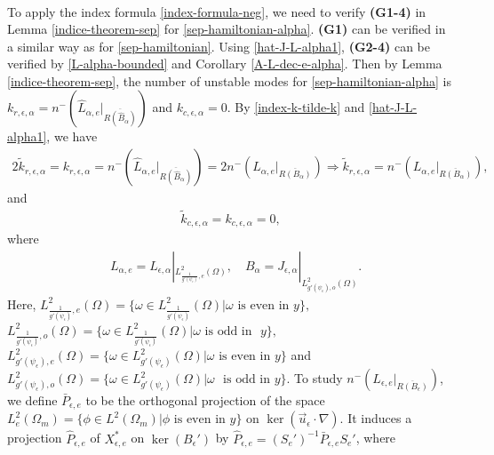 \documentclass[1 [leqno, 11pt]{amsart}
\numberwithin{equation}{section}
\let\ep=\epsilon
\begin{document}
\begin{CJK*}{GBK}{song}
\begin{align}
\end{align}
To apply the index formula  \eqref{index-formula-neg},
 we need to verify
{\textbf{(G1-4)}}  in Lemma \ref{indice-theorem-sep} for \eqref{sep-hamiltonian-alpha}. {\textbf{(G1)}} can be verified in a similar way as for \eqref{sep-hamiltonian}. Using \eqref{hat-J-L-alpha1},
{\textbf{(G2-4)}} can be verified by \eqref{L-alpha-bounded} and Corollary \ref{A-L-dec-e-alpha}. Then by Lemma \ref{indice-theorem-sep}, the number of unstable modes  for \eqref{sep-hamiltonian-alpha} is
$k_{r,\ep,\alpha}=n^-\left(\hat{L}_{\alpha,e}|_{\overline{R(\hat{B}_\alpha)}} \right)$ and $k_{c,\ep,\alpha}=0$. By \eqref{index-k-tilde-k} and  \eqref{hat-J-L-alpha1},
we have
\begin{align*}
2\tilde k_{r,\ep,\alpha}=k_{r,\ep,\alpha}=n^-\left(\hat{L}_{\alpha,e}|_{\overline{R(\hat{B}_\alpha)}} \right)=2n^-\left(L_{\alpha,e}|_{\overline{R(B_\alpha)}} \right)\Longrightarrow\tilde k_{r,\ep,\alpha}=n^-\left(L_{\alpha,e}|_{\overline{R(B_\alpha)}} \right),
\end{align*}
and
\begin{align}\label{index-formula-for-modulational-instabilitykc}\tilde k_{c,\ep,\alpha}=k_{c,\ep,\alpha}=0,
\end{align}
 where
 \begin{align}\label{L-alpha-e B-alpha}
 &L_{\alpha,e}=L_{\ep,\alpha}|_{L^2_{\frac{1}{g'(\psi_\ep)},e}(\Omega)},\quad B_\alpha=J_{\ep,\alpha}|_{L^2_{{g'(\psi_\ep)},o}(\Omega)}.
 \end{align}
Here,
$L^2_{\frac{1}{g'(\psi_\ep)},e}(\Omega)=\{\omega\in L^2_{\frac{1}{g'(\psi_\ep)}}(\Omega)|\omega \text{ is even in }y\},$
$L^2_{\frac{1}{g'(\psi_\ep)},o}(\Omega)=\{\omega\in L^2_{\frac{1}{g'(\psi_\ep)}}(\Omega)|\omega  \text{ is odd in }$ $ y\},$
$L^2_{{g'(\psi_\ep)},e}(\Omega)=\{\omega\in L^2_{{g'(\psi_\ep)}}(\Omega)|\omega \text{ is even in }y\}$
and $L^2_{{g'(\psi_\ep)},o}(\Omega)=\{\omega\in L^2_{{g'(\psi_\ep)}}(\Omega)|\omega$ $ \text{ is odd in }y\}$.
To study $n^-\left( L_{\ep,e} |_{\overline{R(B_\ep)}} \right)$,  we define
$\bar{P}_{\ep,e}$ to be the orthogonal   projection of the space $ L_e^2(\Omega_m)=\{\phi\in L^2(\Omega_m)|\phi \text{ is even in } y\}$ on $\ker(\vec{u}_\ep\cdot\nabla)$. It induces  a   projection
$\hat{P}_{\ep,e}$ of $X_{\ep, e}^*$ on $\ker (B_\ep')$ by $\hat{P}_{\ep,e}=(S_e')^{-1}\bar{P}_{\ep,e} S_e'$, where

\end{CJK*}
\end{document}
